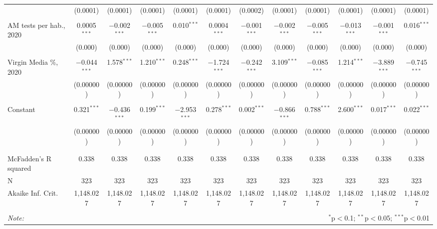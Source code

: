 \documentclass[Royal,times,sageh]{sagej}
\begin{document}
\begin{table}
\begin{tabular}{@{\extracolsep{5pt}}lccccccccccc}
  & (0.0001) & (0.0001) & (0.0001) & (0.0001) & (0.0001) & (0.0002) & (0.0001) & (0.0001) & (0.0001) & (0.0001) & (0.0001) \\ 
  & & & & & & & & & & & \\ 
 AM tests per hab., 2020 & 0.0005$^{***}$ & $-$0.002$^{***}$ & $-$0.005$^{***}$ & 0.010$^{***}$ & 0.0004$^{***}$ & $-$0.001$^{***}$ & $-$0.002$^{***}$ & $-$0.005$^{***}$ & $-$0.013$^{***}$ & $-$0.001$^{***}$ & 0.016$^{***}$ \\ 
  & (0.000) & (0.000) & (0.000) & (0.000) & (0.000) & (0.000) & (0.000) & (0.000) & (0.000) & (0.000) & (0.000) \\ 
  & & & & & & & & & & & \\ 
 Virgin Media \%, 2020 & $-$0.044$^{***}$ & 1.578$^{***}$ & 1.210$^{***}$ & 0.248$^{***}$ & $-$1.724$^{***}$ & $-$0.242$^{***}$ & 3.109$^{***}$ & $-$0.085$^{***}$ & 1.214$^{***}$ & $-$3.889$^{***}$ & $-$0.745$^{***}$ \\ 
  & (0.00000) & (0.00000) & (0.00000) & (0.00000) & (0.00000) & (0.00000) & (0.00000) & (0.00000) & (0.00000) & (0.00000) & (0.00000) \\ 
  & & & & & & & & & & & \\ 
 Constant & 0.321$^{***}$ & $-$0.436$^{***}$ & 0.199$^{***}$ & $-$2.953$^{***}$ & 0.278$^{***}$ & 0.002$^{***}$ & $-$0.866$^{***}$ & 0.788$^{***}$ & 2.600$^{***}$ & 0.017$^{***}$ & 0.022$^{***}$ \\ 
  & (0.00000) & (0.00000) & (0.00000) & (0.00000) & (0.00000) & (0.00000) & (0.00000) & (0.00000) & (0.00000) & (0.00000) & (0.00000) \\ 
  & & & & & & & & & & & \\ 
\hline \\[-1.8ex] 
McFadden's R squared & 0.338 & 0.338 & 0.338 & 0.338 & 0.338 & 0.338 & 0.338 & 0.338 & 0.338 & 0.338 & 0.338 \\ 
N & 323 & 323 & 323 & 323 & 323 & 323 & 323 & 323 & 323 & 323 & 323 \\ 
Akaike Inf. Crit. & 1,148.027 & 1,148.027 & 1,148.027 & 1,148.027 & 1,148.027 & 1,148.027 & 1,148.027 & 1,148.027 & 1,148.027 & 1,148.027 & 1,148.027 \\ 
\hline 
\hline \\[-1.8ex] 
\textit{Note:}  & \multicolumn{11}{r}{$^{*}$p$<$0.1; $^{**}$p$<$0.05; $^{***}$p$<$0.01} \\ 
\end{tabular} 
\end{table}
\end{document}
